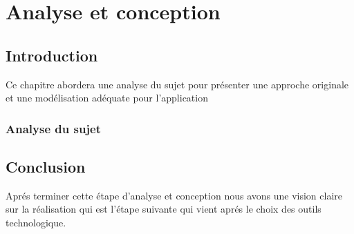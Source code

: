 \chapter{Analyse et conception}



\section{Introduction}

Ce chapitre abordera une analyse du sujet pour présenter une approche originale et une modélisation adéquate pour l’application


\subsection{Analyse du sujet}




\section{Conclusion} 

Aprés terminer cette étape d'analyse et conception nous avons une vision claire sur la réalisation qui est l'étape suivante qui vient aprés le choix des outils technologique.


